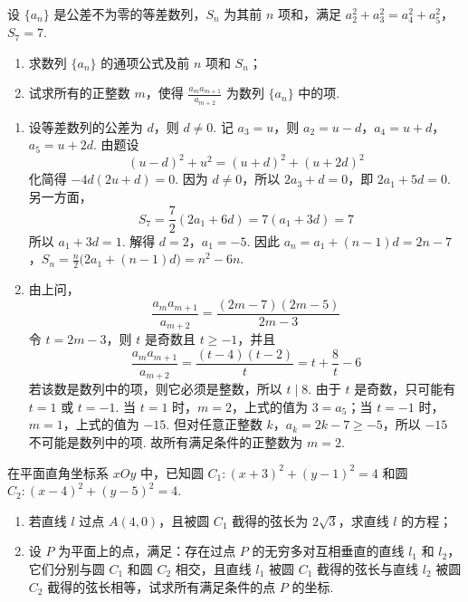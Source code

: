 \begin{problem}
设 \(\{a_n\}\) 是公差不为零的等差数列，\(S_n\) 为其前 \(n\) 项和，满足 \(a_2^2+a_3^2=a_4^2+a_5^2\)，\(S_7=7\).

\begin{enumerate}
\item 求数列 \(\{a_n\}\) 的通项公式及前 \(n\) 项和 \(S_n\)；
\item 试求所有的正整数 \(m\)，使得 \(\frac{a_ma_{m+1}}{a_{m+2}}\) 为数列 \(\{a_n\}\) 中的项.
\end{enumerate}
\end{problem}

\begin{solution}
\begin{enumerate}
\item 设等差数列的公差为 \(d\)，则 \(d\ne0\). 记 \(a_3=u\)，则
\(a_2=u-d\)，\(a_4=u+d\)，\(a_5=u+2d\).
由题设
\[
(u-d)^2+u^2=(u+d)^2+(u+2d)^2
\]
化简得 \(-4d(2u+d)=0\). 因为 \(d\ne0\)，所以 \(2a_3+d=0\)，即 \(2a_1+5d=0\). 另一方面，
\[
S_7=\frac{7}{2}(2a_1+6d)=7(a_1+3d)=7
\]
所以 \(a_1+3d=1\). 解得 \(d=2\)，\(a_1=-5\). 因此
\(a_n=a_1+(n-1)d=2n-7\)，\(S_n=\frac{n}{2}\bigl(2a_1+(n-1)d\bigr)=n^2-6n\).

\item 由上问，
\[
\frac{a_ma_{m+1}}{a_{m+2}}=\frac{(2m-7)(2m-5)}{2m-3}
\]
令 \(t=2m-3\)，则 \(t\) 是奇数且 \(t\ge-1\)，并且
\[
\frac{a_ma_{m+1}}{a_{m+2}}=\frac{(t-4)(t-2)}{t}=t+\frac{8}{t}-6
\]
若该数是数列中的项，则它必须是整数，所以 \(t\mid8\). 由于 \(t\) 是奇数，只可能有 \(t=1\) 或 \(t=-1\). 当 \(t=1\) 时，\(m=2\)，上式的值为 \(3=a_5\)；当 \(t=-1\) 时，\(m=1\)，上式的值为 \(-15\). 但对任意正整数 \(k\)，\(a_k=2k-7\ge-5\)，所以 \(-15\) 不可能是数列中的项. 故所有满足条件的正整数为 \(m=2\).
\end{enumerate}
\end{solution}

\begin{problem}
在平面直角坐标系 \(xOy\) 中，已知圆 \(C_1:(x+3)^2+(y-1)^2=4\) 和圆 \(C_2:(x-4)^2+(y-5)^2=4\).

\begin{enumerate}
\item 若直线 \(l\) 过点 \(A(4,0)\)，且被圆 \(C_1\) 截得的弦长为 \(2\sqrt3\)，求直线 \(l\) 的方程；
\item 设 \(P\) 为平面上的点，满足：存在过点 \(P\) 的无穷多对互相垂直的直线 \(l_1\) 和 \(l_2\)，它们分别与圆 \(C_1\) 和圆 \(C_2\) 相交，且直线 \(l_1\) 被圆 \(C_1\) 截得的弦长与直线 \(l_2\) 被圆 \(C_2\) 截得的弦长相等，试求所有满足条件的点 \(P\) 的坐标.
\end{enumerate}

\end{problem}

